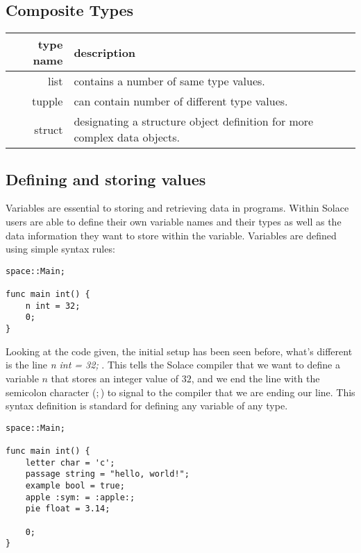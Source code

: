 \documentclass{article}
\begin{document}
\subsection{Composite Types}
\begin{center}
\begin{tabular}{|r|l|}
	\hline
	type name & description \\
	\hline
	\hline
	list & contains a number of same type values. \\
	tupple & can contain number of different type values. \\
	struct & designating a structure object definition for more complex data objects. \\
	\hline
\end{tabular}
\end{center}

\subsection{Defining and storing values}

Variables are essential to storing and retrieving data in programs. Within Solace users are able to define their own variable names and their types
as well as the data information they want to store within the variable. Variables are defined using simple syntax rules:

\begin{lstlisting}
space::Main;

func main int() {
	n int = 32;
 	0;
}
\end{lstlisting}

Looking at the code given, the initial setup has been seen before, what's different is the line \textit{n int = 32;} . This tells the Solace compiler that we want
to define a variable $n$ that stores an integer value of $32$, and we end the line with the semicolon character ($;$) to signal to the compiler that we are ending our
line. This syntax definition is standard for defining any variable of any type.

\begin{lstlisting}
space::Main;

func main int() {
	letter char = 'c';
	passage string = "hello, world!";
 	example bool = true;
  	apple :sym: = :apple:;
   	pie float = 3.14;

 	0;
}
\end{lstlisting}
\end{document}
